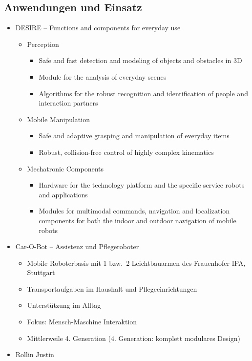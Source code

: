 \subsection{Anwendungen und Einsatz}
\begin{itemize}
	\item DESIRE -- Functions and components for everyday use
	\begin{itemize}
		\item Perception
		\begin{itemize}
			\item Safe and fast detection and modeling of objects and obstacles in 3D
			\item Module for the analysis of everyday scenes
			\item Algorithms for the robust recognition and identification of people and interaction partners
		\end{itemize}
		\item Mobile Manipulation
		\begin{itemize}
			\item Safe and adaptive grasping and manipulation of everyday items
			\item Robust, collision-free control of highly complex kinematics
		\end{itemize}
		\item Mechatronic Components
		\begin{itemize}
			\item Hardware for the technology platform and the specific service robots and applications
			\item Modules for multimodal commands, navigation and localization components for both the indoor and outdoor navigation of mobile robots
		\end{itemize}
	\end{itemize}
	\item Car-O-Bot -- Assistenz und Pflegeroboter
	\begin{itemize}
		\item Mobile Roboterbasis mit 1 bzw.\ 2 Leichtbauarmen des Frauenhofer IPA, Stuttgart
		\item Transportaufgaben im Haushalt und Pflegeeinrichtungen
		\item Unterstützung im Alltag
		\item Fokus: Mensch-Maschine Interaktion
		\item Mittlerweile 4. Generation (4. Generation: komplett modulares Design)
	\end{itemize}
	\item Rollin Justin

\end{itemize}
